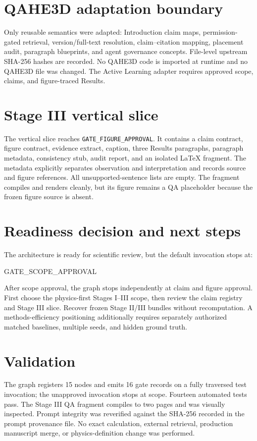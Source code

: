 \documentclass[11pt]{article}
\newcommand{\code}[1]{\texttt{#1}}
\begin{document}
\section{QAHE3D adaptation boundary}
Only reusable semantics were adapted: Introduction claim maps,
permission-gated retrieval, version/full-text resolution, claim--citation
mapping, placement audit, paragraph blueprints, and agent governance concepts.
File-level upstream SHA-256 hashes are recorded. No QAHE3D code is imported at
runtime and no QAHE3D file was changed. The Active Learning adapter requires
approved scope, claims, and figure-traced Results.

\section{Stage III vertical slice}
The vertical slice reaches \code{GATE\_FIGURE\_APPROVAL}. It contains a claim
contract, figure contract, evidence extract, caption, three Results paragraphs,
paragraph metadata, consistency stub, audit report, and an isolated \LaTeX{}
fragment. The metadata explicitly separates observation and interpretation and
records source and figure references. All unsupported-sentence lists are empty.
The fragment compiles and renders cleanly, but its figure remains a QA
placeholder because the frozen figure source is absent.

\section{Readiness decision and next steps}
The architecture is ready for scientific review, but the default invocation
stops at:
\begin{center}
\small\ttfamily GATE\_SCOPE\_APPROVAL
\end{center}
After scope approval, the graph stops independently at claim and figure
approval. First choose the physics-first Stages I--III scope, then review the
claim registry and Stage III slice. Recover frozen Stage II/III bundles without
recomputation. A methods-efficiency positioning additionally requires separately
authorized matched baselines, multiple seeds, and hidden ground truth.

\section{Validation}
The graph registers 15 nodes and emits 16 gate records on a fully traversed test
invocation; the unapproved invocation stops at scope. Fourteen automated tests
pass. The Stage III QA fragment compiles to two pages and was visually
inspected. Prompt integrity was reverified against the SHA-256 recorded in the
prompt provenance file. No exact calculation, external retrieval, production
manuscript merge, or physics-definition change was performed.
\end{document}
